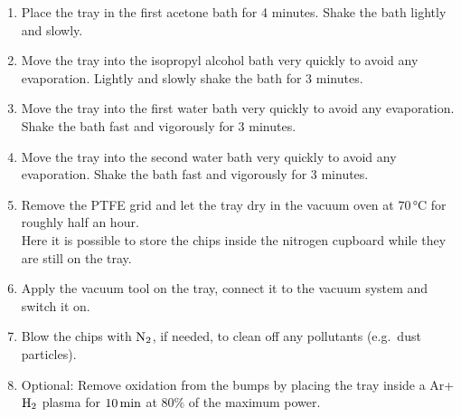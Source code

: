 \begin{appendices}
\begin{enumerate}
\item Place the tray in the first acetone bath for 4 minutes. Shake the bath lightly and slowly.


\item Move the tray into the isopropyl alcohol bath very quickly to avoid any evaporation. Lightly and slowly shake the bath for 3 minutes.

\item Move the tray into the first water bath very quickly to avoid any evaporation. Shake the bath fast and vigorously for 3 minutes.

\item Move the tray into the second water bath very quickly to avoid any evaporation. Shake the bath fast and vigorously for 3 minutes.





\item Remove the \ac{PTFE} grid and let the tray dry in the vacuum oven at $70\,\si{\degreeCelsius}$ for roughly half an hour.
\\Here it is possible to store the chips inside the nitrogen cupboard while they are still on the tray.

\item Apply the vacuum tool on the tray, connect it to the vacuum system and switch it on.

\item Blow the chips with $\rm{N_2}$, if needed, to clean off any pollutants (e.g.~dust particles).

\item Optional: Remove oxidation from the bumps by placing the tray inside a Ar+$\rm{H_2}$ plasma for $10\,\rm{min}$ at $80\%$ of the maximum power.


\end{enumerate}
\end{appendices}
